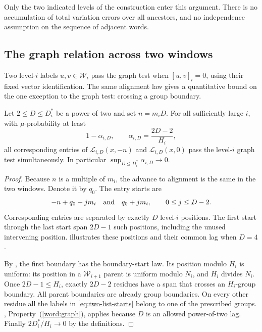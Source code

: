 Only the two indicated levels of the construction enter this
argument. There is no accumulation of total variation errors
over all ancestors, and no independence assumption on the
sequence of adjacent words.

\subsection{The graph relation across two windows}

Two level-$i$ labels $u,v\in\mathcal W_i$ pass the graph test
when $[u,v]_i=0$, using their fixed vector identification.
The same alignment law gives a quantitative bound on the one
exception to the graph test: crossing a group boundary.

\begin{lemma}\label{lem:graph-windows}
Let $2\le D\le D_i^*$ be a power of two and set $n=m_iD$.
For all sufficiently large $i$, with $\mu$-probability at least
\[
 1-\alpha_{i,D},\qquad
 \alpha_{i,D}=\frac{2D-2}{H_i},
\]
all corresponding entries of
$\mathcal L_{i,D}(x,-n)$ and
$\mathcal L_{i,D}(x,0)$ pass the level-$i$ graph test simultaneously.
In particular $\sup_{D\le D_i^*}\alpha_{i,D}\to0$.
\end{lemma}

\begin{proof}
Because $n$ is a multiple of $m_i$, the advance to alignment
is the same in the two windows. Denote it by $q_0$.
The entry starts are
\begin{equation}\label{eq:two-list-starts}
 -n+q_0+jm_i
 \quad\hbox{and}\quad
 q_0+jm_i,\qquad 0\le j\le D-2.
\end{equation}
Corresponding entries are separated by exactly $D$ level-$i$
positions. The first start through the last start span
$2D-1$ such positions, including the unused intervening position.
 illustrates these positions and their common lag
when $D=4$.

By , the first boundary has the
boundary-start law. Its position modulo $H_i$ is uniform:
its position in a $\mathcal W_{i+1}$ parent is uniform modulo
$N_i$, and $H_i$ divides $N_i$. Once $2D-1\le H_i$, exactly
$2D-2$ residues have a span that crosses an $H_i$-group boundary.
All parent boundaries are already group boundaries.
On every other residue all the labels in \eqref{eq:two-list-starts}
belong to one of the prescribed groups.
, Property~(\ref{word:graph}), applies because $D$ is an
allowed power-of-two lag.
Finally $2D_i^*/H_i\to0$ by the definitions.
\end{proof}

